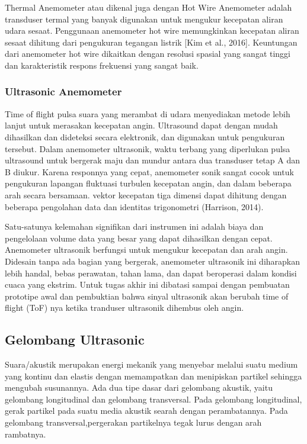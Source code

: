 	Thermal Anemometer atau dikenal juga dengan Hot Wire Anemometer adalah transduser termal yang banyak digunakan untuk mengukur kecepatan aliran udara sesaat. Penggunaan anemometer hot wire memungkinkan kecepatan aliran sesaat dihitung dari pengukuran tegangan listrik [Kim et al., 2016]. Keuntungan dari anemometer hot wire dikaitkan dengan resolusi spasial yang sangat tinggi dan karakteristik respons frekuensi yang sangat baik.
	
	\subsubsection{Ultrasonic Anemometer}
	
	Time of flight pulsa suara yang merambat di udara menyediakan metode lebih lanjut untuk merasakan kecepatan angin. Ultrasound dapat dengan mudah dihasilkan dan dideteksi secara elektronik, dan digunakan untuk pengukuran tersebut. Dalam anemometer ultrasonik, waktu terbang yang diperlukan pulsa ultrasound untuk bergerak maju dan mundur antara dua transduser tetap A dan B diukur. Karena responnya yang cepat, anemometer sonik sangat cocok untuk pengukuran lapangan fluktuasi turbulen kecepatan angin, dan dalam beberapa arah secara bersamaan. vektor kecepatan tiga dimensi dapat dihitung dengan beberapa pengolahan data dan identitas trigonometri (Harrison, 2014).
	
	Satu-satunya kelemahan signifikan dari instrumen ini adalah biaya dan pengelolaan volume data yang besar yang dapat dihasilkan dengan cepat. Anemometer ultrasonik berfungsi untuk mengukur kecepatan dan arah angin. Didesain tanpa ada bagian yang bergerak, anemometer ultrasonik ini diharapkan lebih handal, bebas perawatan, tahan lama, dan dapat beroperasi dalam kondisi cuaca yang ekstrim. Untuk tugas akhir ini dibatasi sampai dengan pembuatan prototipe awal dan pembuktian bahwa sinyal ultrasonik akan berubah time of flight (ToF) nya ketika tranduser ultrasonik dihembus oleh angin.

\subsection{Gelombang Ultrasonic}
Suara/akustik merupakan energi mekanik yang menyebar melalui suatu medium yang kontinu dan elastis dengan memampatkan dan menipiskan partikel sehingga mengubah susunannya. Ada dua tipe dasar dari gelombang akustik, yaitu gelombang longitudinal dan gelombang transversal. Pada gelombang longitudinal, gerak partikel pada suatu media akustik searah dengan perambatannya. Pada gelombang transversal,pergerakan partikelnya tegak lurus dengan arah rambatnya.

